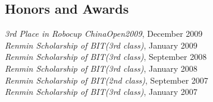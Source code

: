 \documentclass[margin]{res}
\begin{document}
\begin{resume}
\section{Honors and Awards }             
             {\it 3rd Place in Robocup ChinaOpen2009}, 	December	2009 \\             			
			 {\it Renmin Scholarship of BIT(3rd class)}, January	2009 \\            	
			 {\it Renmin Scholarship of BIT(3rd class)}, September	2008 \\            
			 {\it Renmin Scholarship of BIT(3rd class)}, January	2008 \\            
			 {\it Renmin Scholarship of BIT(2nd class)}, September	2007 \\  
			 {\it Renmin Scholarship of BIT(3rd class)}, January	2007 			 			 
\end{resume}
\end{document}
